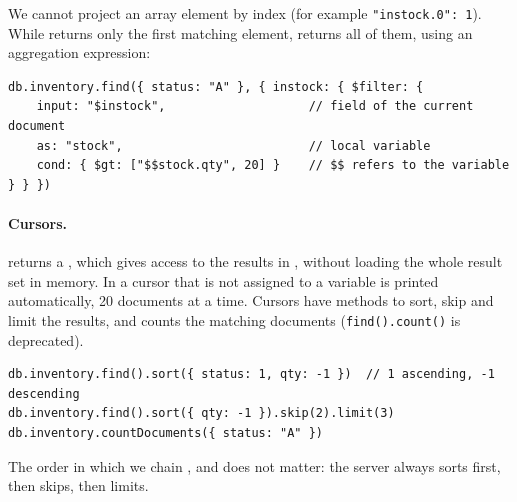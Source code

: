 We cannot project an array element by index (for example \texttt{"instock.0": 1}). While  returns only the first matching element,  returns all of them, using an aggregation expression:
\begin{lstlisting}
db.inventory.find({ status: "A" }, { instock: { $filter: {
    input: "$instock",                    // field of the current document
    as: "stock",                          // local variable
    cond: { $gt: ["$$stock.qty", 20] }    // $$ refers to the variable
} } })
\end{lstlisting}

\paragraph{Cursors.}  returns a , which gives access to the results in , without loading the whole result set in memory. In  a cursor that is not assigned to a variable is printed automatically, 20 documents at a time. Cursors have methods to sort, skip and limit the results, and  counts the matching documents (\texttt{find().count()} is deprecated).
\begin{lstlisting}
db.inventory.find().sort({ status: 1, qty: -1 })  // 1 ascending, -1 descending
db.inventory.find().sort({ qty: -1 }).skip(2).limit(3)
db.inventory.countDocuments({ status: "A" })
\end{lstlisting}
The order in which we chain ,  and  does not matter: the server always sorts first, then skips, then limits.

